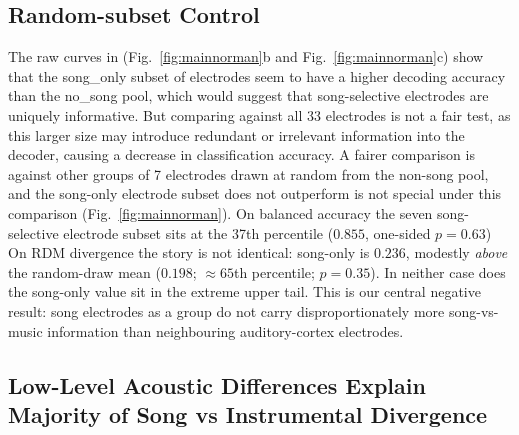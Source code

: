 \documentclass[11pt]{article}
\begin{document}
\subsection{Random-subset Control}\label{sec:randsubset}

The raw curves in  (Fig.~\ref{fig:mainnorman}b and Fig.~\ref{fig:mainnorman}c) show that the \textsf{song\_only} subset of electrodes seem to have a higher decoding accuracy than the \textsf{no\_song} pool, which would suggest that song-selective electrodes are uniquely informative. But comparing against all 33 electrodes is not a fair test, as this larger size may introduce redundant or irrelevant information into the decoder, causing a decrease in classification accuracy. A fairer comparison is against other groups of 7 electrodes drawn at random from the non-song pool, and the song-only electrode subset does not outperform is not special under this comparison (Fig.~\ref{fig:mainnorman}). On balanced accuracy the seven song-selective electrode subset sits at the 37th percentile ($0.855$,  one-sided $p = 0.63$) On RDM divergence the story is not identical: song-only is $0.236$, modestly \emph{above} the random-draw mean ($0.198$; $\approx 65$th percentile; $p = 0.35$). In neither case does the song-only value sit in the extreme upper tail. This is our central negative result: song electrodes as a group do not carry disproportionately more song-vs-music information than neighbouring auditory-cortex electrodes.

\subsection{Low-Level Acoustic Differences Explain Majority of Song vs Instrumental Divergence }\label{sec:acoustic}
\end{document}
